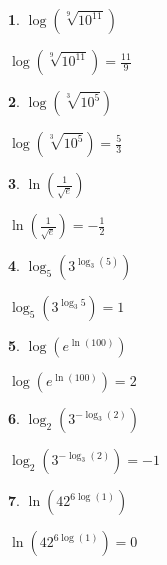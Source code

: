 \documentclass{amsbook}
\newtheorem{exc}{}
\newenvironment{ex}{\begin{exc}\normalfont}{\end{exc}}
\numberwithin{section}{chapter}
\numberwithin{equation}{chapter}
\begin{document}
\begin{multicols}{3}
\begin{ex}
	$\log \left(\sqrt[9]{10^{11}}\right)$
	\begin{sol}
		$\log \left(\sqrt[9]{10^{11}}\right) = \frac{11}{9}$
	\end{sol}
\end{ex}
\begin{ex}
	$\log\left( \sqrt[3]{10^5} \right)$
	\begin{sol}
		$\log\left( \sqrt[3]{10^5} \right) = \frac{5}{3}$
	\end{sol}
\end{ex}
\begin{ex}
	$\ln \left( \frac{1}{\sqrt{e}}\right)$
	\begin{sol}
		 $\ln \left( \frac{1}{\sqrt{e}}\right) = -\frac{1}{2} $
	\end{sol}
\end{ex}
\begin{ex}
	$\log_{5} \left(3^{\log_{3} (5)}\right)$
	\begin{sol}
		$\log_{5} \left(3^{\log_{3} 5}\right) = 1$
	\end{sol}
\end{ex}
\begin{ex}
	$\log\left(e^{\ln(100)}\right)$ 
	\begin{sol}
		$\log\left(e^{\ln(100)}\right) = 2$
	\end{sol}
\end{ex}
\begin{ex}
	$\log_{2}\left(3^{-\log_{3}(2)}\right)$
	\begin{sol}
		 $\log_{2}\left(3^{-\log_{3}(2)}\right) = -1$
	\end{sol}
\end{ex}
\begin{ex}
	$\ln\left(42^{6\log(1)}\right)$
	\begin{sol}
		$\ln\left(42^{6\log(1)}\right) = 0$
	\end{sol}
\end{ex}
\end{multicols}
\end{document}

